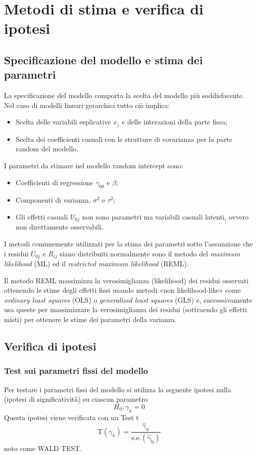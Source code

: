 \documentclass[a4page, 11pt]{article} %
\begin{document}
\section{Metodi di stima e verifica di ipotesi}
\subsection*{Specificazione del modello e stima dei parametri}
La specificazione del modello comporta la scelta del modello più soddisfacente. Nel caso di modelli lineari gerarchici tutto ciò implica:
\begin{itemize}
\item Scelta delle variabili esplicative $x_j$ e delle interazioni della parte fissa;
\item Scelta dei coefficienti casuali con le strutture di covarianza per la parte random del modello.
\end{itemize}
I parametri da stimare nel modello random intercept sono:
\begin{itemize}
\item Coefficienti di regressione $\gamma_{00}$ e $\beta$;
\item Componenti di varianza, $\sigma^2$ e $\tau^2$; 
\item Gli effetti casuali $U_{0j}$ non sono parametri ma variabili casuali latenti, ovvero non direttamente osservabili. 
\end{itemize}
I metodi comunemente utilizzati per la stima dei parametri sotto l’assunzione che i residui $U_{0j}$ e $R_{ij}$ siano distribuiti normalmente sono il metodo del \textit{maximum likelihood} (ML) ed il \textit{restricted maximum likelihood} (REML).

Il metodo REML massimizza la verosimiglianza (likelihood) dei residui osservati ottenendo le stime degli effetti fissi usando metodi «non likelihood-like» come \textit{ordinary least squares} (OLS) o \textit{generalized least squares} (GLS) e, successivamente usa queste per massimizzare la verosimiglianza dei residui (sottraendo gli effetti misti) per ottenere le stime dei parametri della varianza.
\subsection*{Verifica di ipotesi}
\subsubsection*{Test sui parametri fissi del modello}
Per testare i parametri fissi del modello si utilizza la seguente ipotesi nulla (ipotesi di significatività) su ciascun parametro 
\begin{equation*}
H_0: \gamma_h = 0
\end{equation*}
\newline
Questa ipotesi viene verificata con un Test t
\begin{equation*}
\mathrm{T}(\gamma_h) = \frac{\hat{\gamma}_h}{\mathrm{s.e.(\hat{\gamma}_h)}}
\end{equation*}
noto come WALD TEST. 
\end{document}
